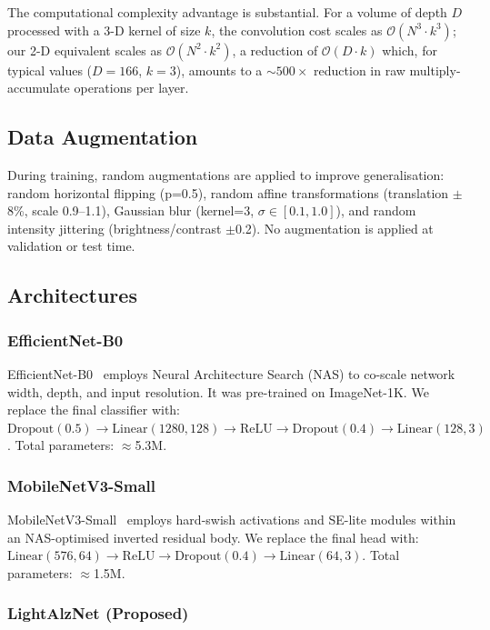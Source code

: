 \documentclass[conference]{IEEEtran}
\begin{document}
The computational complexity advantage is substantial. For a
volume of depth $D$ processed with a 3-D kernel of size $k$,
the convolution cost scales as $\mathcal{O}(N^3 \cdot k^3)$;
our 2-D equivalent scales as $\mathcal{O}(N^2 \cdot k^2)$,
a reduction of $\mathcal{O}(D \cdot k)$ which, for typical
values ($D=166$, $k=3$), amounts to a $\sim\!500\times$
reduction in raw multiply-accumulate operations per layer.

\subsection{Data Augmentation}
During training, random augmentations are applied to improve
generalisation: random horizontal flipping (p=0.5), random
affine transformations (translation $\pm$8\%, scale 0.9--1.1),
Gaussian blur (kernel=3, $\sigma\!\in\![0.1,1.0]$), and random
intensity jittering (brightness/contrast $\pm$0.2). No
augmentation is applied at validation or test time.

\subsection{Architectures}
\label{sec:arch}

\subsubsection{EfficientNet-B0}
EfficientNet-B0~\cite{tan2019} employs Neural Architecture
Search (NAS) to co-scale network width, depth, and input
resolution. It was pre-trained on ImageNet-1K. We replace the
final classifier with:
$\mathrm{Dropout}(0.5) \to \mathrm{Linear}(1280,128) \to
\mathrm{ReLU} \to \mathrm{Dropout}(0.4) \to \mathrm{Linear}(128,3)$.
Total parameters: $\approx$5.3M.

\subsubsection{MobileNetV3-Small}
MobileNetV3-Small~\cite{howard2019} employs hard-swish
activations and SE-lite modules within an NAS-optimised inverted
residual body. We replace the final head with:
$\mathrm{Linear}(576,64) \to \mathrm{ReLU} \to
\mathrm{Dropout}(0.4) \to \mathrm{Linear}(64,3)$.
Total parameters: $\approx$1.5M.

\subsubsection{LightAlzNet (Proposed)}
\label{sec:lightalznet}
\end{document}
